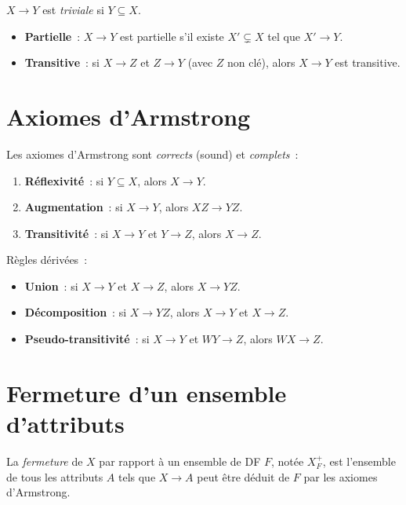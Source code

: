 \begin{definition}
$X \to Y$ est \emph{triviale} si $Y \subseteq X$.
\end{definition}

\begin{definition}
\begin{itemize}
    \item \textbf{Partielle}~: $X \to Y$ est partielle s'il existe $X' \subsetneq X$
          tel que $X' \to Y$.
    \item \textbf{Transitive}~: si $X \to Z$ et $Z \to Y$ (avec $Z$ non cl\'e),
          alors $X \to Y$ est transitive.
\end{itemize}
\end{definition}

\section{Axiomes d'Armstrong}

\begin{theoreme}
Les axiomes d'Armstrong sont \emph{corrects} (sound) et \emph{complets}~:
\begin{enumerate}
    \item \textbf{R\'eflexivit\'e}~: si $Y \subseteq X$, alors $X \to Y$.
    \item \textbf{Augmentation}~: si $X \to Y$, alors $XZ \to YZ$.
    \item \textbf{Transitivit\'e}~: si $X \to Y$ et $Y \to Z$, alors $X \to Z$.
\end{enumerate}
R\`egles d\'eriv\'ees~:
\begin{itemize}
    \item \textbf{Union}~: si $X \to Y$ et $X \to Z$, alors $X \to YZ$.
    \item \textbf{D\'ecomposition}~: si $X \to YZ$, alors $X \to Y$ et $X \to Z$.
    \item \textbf{Pseudo-transitivit\'e}~: si $X \to Y$ et $WY \to Z$, alors $WX \to Z$.
\end{itemize}
\end{theoreme}

\section{Fermeture d'un ensemble d'attributs}

\begin{definition}[Fermeture $X^+$]
La \emph{fermeture} de $X$ par rapport \`a un ensemble de DF $F$, not\'ee $X^+_F$,
est l'ensemble de tous les attributs $A$ tels que $X \to A$ peut \^etre
d\'eduit de $F$ par les axiomes d'Armstrong.
\end{definition}

